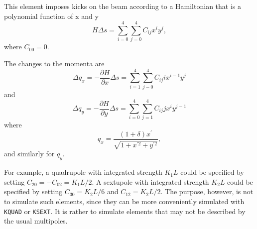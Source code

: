 This element imposes kicks on the beam according
to a Hamiltonian that is a polynomial function of x and y 
\begin{equation}
H\Delta s = \sum_{i=0}^{4} \sum_{j=0}^{4} C_{ij} x^i y^j,
\end{equation}
where $C_{00} = 0$.

The changes to the momenta are
\begin{equation}
\Delta q_x = -\frac{\partial H}{\partial x}\Delta s = \sum_{i=1}^4 \sum_{j-0}^4 C_{ij} i x^{i-1} y^j
\end{equation}
and
\begin{equation}
\Delta q_y = -\frac{\partial H}{\partial y}\Delta s = \sum_{i=0}^4 \sum_{j=1}^4 C_{ij} j x^i y^{j-1}
\end{equation}
where
\begin{equation}
  q_x = \frac{(1+\delta) x^\prime}{\sqrt{1 + x^{\prime 2} + y^{\prime 2}}},
\end{equation}
and similarly for $q_y$.

For example, a quadrupole with integrated strength $K_1 L$  could be specified by setting $C_{20} = -C_{02} = K_1 L/2$.
A sextupole with integrated strength $K_2 L$ could be specified by setting $C_{30} = K_2 L/6$ and $C_{12} = K_2 L/2$.
The purpose, however, is not to simulate such elements, since they can be more conveniently simulated with 
\verb|KQUAD| or \verb|KSEXT|.
It is rather to simulate elements that may not be described by the usual multipoles.